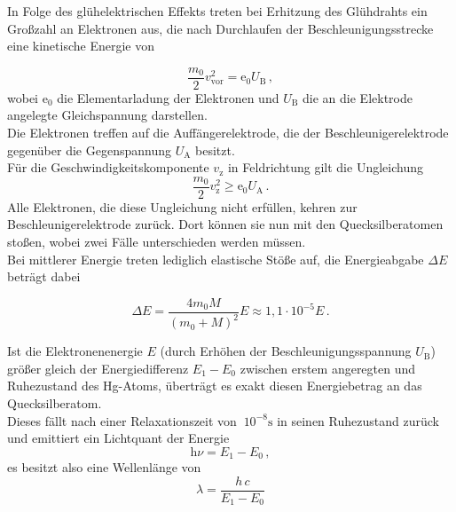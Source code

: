 In Folge des glühelektrischen Effekts treten bei Erhitzung des Glühdrahts
ein Großzahl an Elektronen aus, die nach Durchlaufen der Beschleunigungsstrecke
eine kinetische Energie von

\begin{equation*}
    \dfrac{m_0}{2} v^2_\text{vor} = \text{e}_0 U_\text{B} \,,
\end{equation*}
wobei $\text{e}_0$ die Elementarladung der Elektronen und $U_\text{B}$
die an die Elektrode angelegte Gleichspannung darstellen. \\

Die Elektronen treffen auf die Auffängerelektrode, die der Beschleunigerelektrode gegenüber
die Gegenspannung $U_\text{A}$ besitzt. \\

Für die Geschwindigkeitskomponente $v_\text{z}$ in Feldrichtung gilt die Ungleichung
\begin{equation*}
    \dfrac{m_0}{2} v^2_\text{z} \geq \text{e}_0 U_\text{A} \,.
\end{equation*}
Alle Elektronen, die diese Ungleichung nicht erfüllen, kehren zur Beschleunigerelektrode zurück.
Dort können sie nun mit den Quecksilberatomen stoßen, wobei zwei Fälle unterschieden werden müssen. \\

Bei mittlerer Energie treten lediglich elastische Stöße auf, die
Energieabgabe $\Delta E$ beträgt dabei

\begin{equation*}
    \Delta E = \frac{4 m_0 M}{(m_0 + M)^2} E \approx 1,1 \cdot 10^{-5} E \,.
\end{equation*}

Ist die Elektronenenergie $E$ (durch Erhöhen der Beschleunigungsspannung $U_\text{B}$)
größer gleich der Energiedifferenz $E_1 - E_0$ zwischen erstem angeregten und Ruhezustand
des Hg-Atoms, überträgt es exakt diesen Energiebetrag an das Quecksilberatom. \\

Dieses fällt nach einer Relaxationszeit von $~10^{-8} \unit{\second}$
in seinen Ruhezustand zurück und emittiert ein Lichtquant der Energie
\begin{equation*}
    \text{h} \nu = E_1 - E_0 \,,
\end{equation*}
es besitzt also eine Wellenlänge von
\begin{equation}
    \lambda = \dfrac{h \, c}{E_1 - E_0}
    \label{eq:emittwellläng}
\end{equation}


